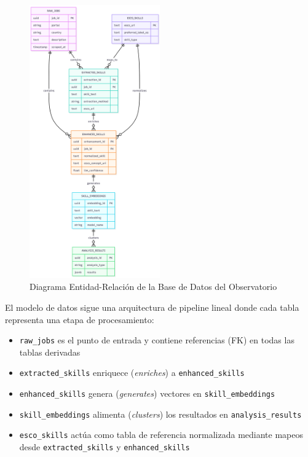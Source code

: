 \begin{figure}[H]
\centering
\includegraphics[width=0.5\textwidth]{diagrams/DiagramaER.png}
\caption{Diagrama Entidad-Relación de la Base de Datos del Observatorio}
\label{fig:diagrama-er}
\end{figure}

El modelo de datos sigue una arquitectura de pipeline lineal donde cada tabla representa una etapa de procesamiento:

\begin{itemize}
    \item \texttt{raw\_jobs} es el punto de entrada y contiene referencias (FK) en todas las tablas derivadas
    \item \texttt{extracted\_skills} enriquece (\textit{enriches}) a \texttt{enhanced\_skills}
    \item \texttt{enhanced\_skills} genera (\textit{generates}) vectores en \texttt{skill\_embeddings}
    \item \texttt{skill\_embeddings} alimenta (\textit{clusters}) los resultados en \texttt{analysis\_results}
    \item \texttt{esco\_skills} actúa como tabla de referencia normalizada mediante mapeos desde \texttt{extracted\_skills} y \texttt{enhanced\_skills}
\end{itemize}

